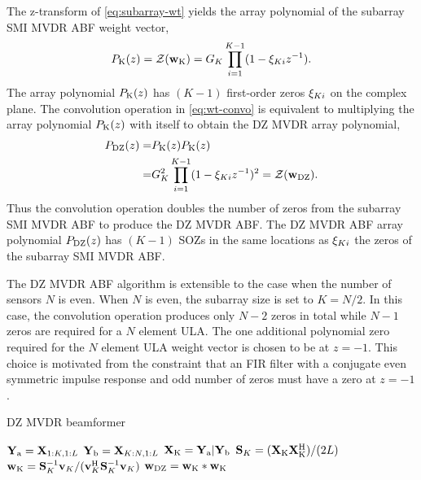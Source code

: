  The z-transform of \eqref{eq:subarray-wt} yields the array polynomial of
 the subarray SMI MVDR ABF weight vector,
\begin{equation}
  \label{eq:subarray-poly}
  {P}_{{\rm K}}(z) = \mathcal{Z}{({\bf w}_{\rm K})} = G_K\prod_{i=1}^{K - 1}( 1 -
  \xi_{Ki} z^{-1}).
\end{equation}
The array polynomial ${P}_{{\rm K}}(z)$ has $(K - 1)$ first-order
zeros $\xi_{Ki}$ on the complex plane. The convolution operation in
\eqref{eq:wt-convo} is equivalent to multiplying the array polynomial
${P}_{{\rm K}}(z)$ with itself to obtain the DZ MVDR array polynomial,
\begin{align*}
{P}_{{\rm DZ}}(z) =& {P}_{{\rm K}}(z){P}_{{\rm K}}(z) \\
                     =& G_K^2\prod\limits_{i=1}^{K - 1}( 1 -
                        \xi_{Ki} z^{-1})^2  = \mathcal{Z}{({\bf w}_{\rm DZ})}.
\end{align*}
Thus the convolution operation doubles the number of zeros from the
subarray SMI MVDR ABF to produce the DZ MVDR ABF. The DZ MVDR ABF
array polynomial ${P}_{{\rm DZ}}(z)$ has $(K - 1)$ SOZs in the same
locations as $\xi_{Ki}$  the zeros of the subarray SMI MVDR ABF.

The DZ MVDR ABF algorithm is extensible to the case when the number of
sensors $N$ is even. When $N$ is even, the subarray size is set to
$K = N/2$. In this case, the convolution operation produces only
$N - 2$ zeros in total while $N - 1$ zeros are required for a $N$
element ULA. The one additional polynomial zero required for the $N$
element ULA weight vector is chosen to be at $z = -1$. This choice is
motivated from the constraint that an FIR filter with a conjugate even
symmetric impulse response and odd number of zeros must have a zero at
$z = -1$ \cite[Sec.~5.7.3]{Oppenheim1989}.


\begin{algorithm}
  \caption{DZ MVDR beamformer} \label{alg:dzmvdr}
  \begin{algorithmic}
     \State $\mathbf{Y}_{{\rm a}} = \mathbf{X}_{1:K,1:L}$
     \State $\mathbf{Y}_{{\rm b}} = \mathbf{X}_{K:N,1:L}$
     \State $\mathbf{X}_{\rm K} = \mathbf{Y}_{{\rm a}} | \mathbf{Y}_{{\rm b}}$
    \EndProcedure
    \State ${\bf S}_{K} = (\mathbf{X}_{\rm K} \mathbf{X}_{\rm K}^{\rm H})/(2L)$
    \State  ${\bf w}_{\rm K} = {\bf S}_{K}^{-1}{\bf v}_{K}/({\bf v}_{K}^{\rm H} {\bf S}_{K}^{-1}{\bf v}_{K})$
    \EndProcedure
    \State ${\bf w}_{\rm DZ} = {\bf w}_{\rm K}*{\bf w}_{\rm K}$
    \EndProcedure
  \end{algorithmic}
\end{algorithm}


